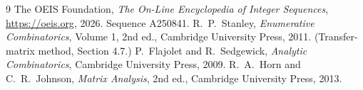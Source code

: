 \documentclass[11pt,a4paper]{article}
\theoremstyle{plain}
\theoremstyle{definition}
\begin{document}
\begin{thebibliography}{9}
 The OEIS Foundation, \emph{The On-Line Encyclopedia of Integer
Sequences}, \url{https://oeis.org}, 2026. Sequence A250841.
 R.~P.~Stanley, \emph{Enumerative Combinatorics}, Volume 1, 2nd ed.,
Cambridge University Press, 2011. (Transfer-matrix method, Section 4.7.)
 P.~Flajolet and R.~Sedgewick, \emph{Analytic Combinatorics}, Cambridge
University Press, 2009.
 R.~A.~Horn and C.~R.~Johnson, \emph{Matrix Analysis}, 2nd ed., Cambridge
University Press, 2013.
\end{thebibliography}
\end{document}
